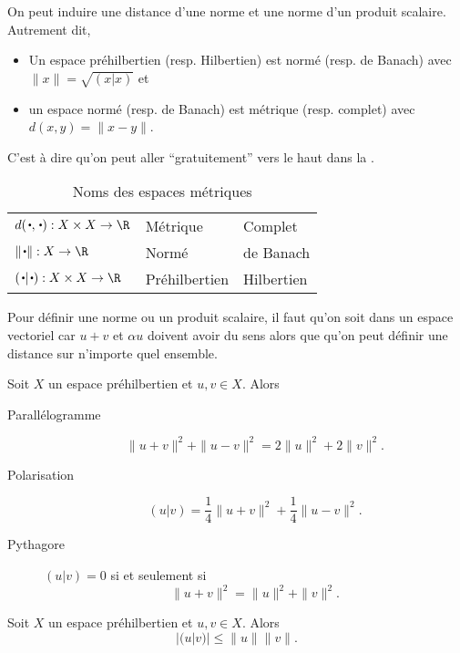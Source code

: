 \begin{myprop}[11.5a]
  On peut induire une distance d'une norme et une norme d'un produit scalaire. Autrement dit,
  \begin{itemize}
    \item Un espace préhilbertien (resp. Hilbertien) est normé (resp. de Banach) avec $\|x\| = \sqrt{(x|x)}$ et
    \item un espace normé (resp. de Banach) est métrique (resp. complet) avec $d(x,y) = \|x-y\|$.
  \end{itemize}
  C'est à dire qu'on peut aller ``gratuitement'' vers le haut dans la .
\end{myprop}

\begin{table}[!ht]
  \centering
  \begin{tabular}{lll}
    $d(\sbt,\sbt):X \times X\to\R$ & Métrique & Complet\\
    $\|\sbt\|:X\to\R$ & Normé & de Banach\\
    $(\sbt|\sbt):X \times X\to\R$ & Préhilbertien & Hilbertien\\
  \end{tabular}
  \caption{Noms des espaces métriques}
  \label{tab:em}
\end{table}

\begin{myrem}
  Pour définir une norme ou un produit scalaire, il faut qu'on soit dans un espace
  vectoriel car $u + v$ et $\alpha u$ doivent avoir du sens alors que qu'on peut
  définir une distance sur n'importe quel ensemble.
\end{myrem}

\begin{myprop}
  Soit $X$ un espace préhilbertien et $u,v \in X$. Alors
  \begin{description}
    \item[Parallélogramme] \[ \|u + v\|^2 + \|u - v\|^2 = 2\|u\|^2 + 2\|v\|^2. \]
    \item[Polarisation] \[ (u|v) = \frac{1}{4}\|u + v\|^2 + \frac{1}{4}\|u - v\|^2. \]
    \item[Pythagore] $(u|v) = 0$ si et seulement si \[ \|u+v\|^2 = \|u\|^2 + \|v\|^2. \]
  \end{description}
\end{myprop}

\begin{myineg}
  Soit $X$ un espace préhilbertien et $u,v \in X$. Alors
  \[ |(u|v)| \leq \|u\| \|v\|. \]
\end{myineg}

